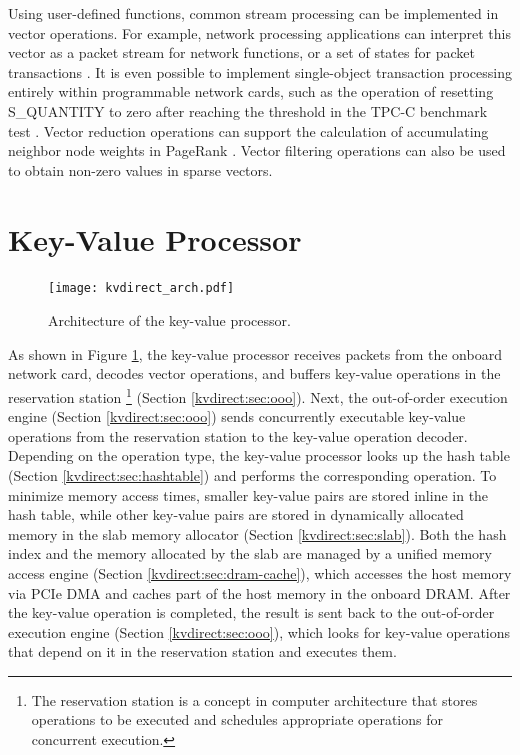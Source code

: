 Using user-defined functions, common stream processing can be implemented in vector operations. For example, network processing applications can interpret this vector as a packet stream for network functions, or a set of states for packet transactions \cite {sivaraman2016packet}. It is even possible to implement single-object transaction processing entirely within programmable network cards, such as the operation of resetting S\_QUANTITY to zero after reaching the threshold in the TPC-C benchmark test \cite {council2010tpc}. Vector reduction operations can support the calculation of accumulating neighbor node weights in PageRank \cite {page1999pagerank}. Vector filtering operations can also be used to obtain non-zero values in sparse vectors.

\section{Key-Value Processor}
\label{kvdirect:sec:kv-processor}

\begin{figure}[htbp]
\centering
\texttt{[image: kvdirect\_arch.pdf]}
\caption{Architecture of the key-value processor.}
\label{kvdirect:fig:kvprocessor-arch}
\end{figure}

As shown in Figure \ref {kvdirect:fig:kvprocessor-arch}, the key-value processor receives packets from the onboard network card, decodes vector operations, and buffers key-value operations in the reservation station \footnote{The reservation station is a concept in computer architecture that stores operations to be executed and schedules appropriate operations for concurrent execution.} (Section \ref {kvdirect:sec:ooo}). Next, the out-of-order execution engine (Section \ref {kvdirect:sec:ooo}) sends concurrently executable key-value operations from the reservation station to the key-value operation decoder. Depending on the operation type, the key-value processor looks up the hash table (Section \ref {kvdirect:sec:hashtable}) and performs the corresponding operation. To minimize memory access times, smaller key-value pairs are stored inline in the hash table, while other key-value pairs are stored in dynamically allocated memory in the slab memory allocator (Section \ref {kvdirect:sec:slab}). Both the hash index and the memory allocated by the slab are managed by a unified memory access engine (Section \ref {kvdirect:sec:dram-cache}), which accesses the host memory via PCIe DMA and caches part of the host memory in the onboard DRAM. After the key-value operation is completed, the result is sent back to the out-of-order execution engine (Section \ref {kvdirect:sec:ooo}), which looks for key-value operations that depend on it in the reservation station and executes them.


